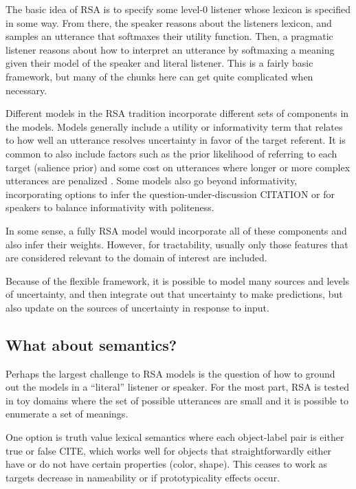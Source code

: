 \documentclass[]{article}
\begin{document}
The basic idea of RSA is to specify some level-0 listener whose lexicon is specified in some way. From there, the speaker reasons about the listeners lexicon, and samples an utterance that softmaxes their utility function. Then, a pragmatic listener reasons about how to interpret an utterance by softmaxing a meaning given their model of the speaker and literal listener. This is a fairly basic framework, but many of the chunks here can get quite complicated when necessary. 

Different models in the RSA tradition incorporate different sets of components in the models. Models generally include a utility or informativity term that relates to how well an utterance resolves uncertainty in favor of the target referent.  It is common to also include factors such as the prior likelihood of referring to each target (salience prior) and some cost on utterances where longer or more complex utterances are penalized \cite{goodman2016}. Some models also go beyond informativity, incorporating options to infer the question-under-discussion CITATION or for speakers to balance informativity with politeness.

In some sense, a fully RSA model would incorporate all of these components and also infer their weights. However, for tractability, usually only those features that are considered relevant to the domain of interest are included.
 
Because of the flexible framework, it is possible to model many sources and levels of uncertainty, and then integrate out that uncertainty to make predictions, but also update on the sources of uncertainty in response to input. 

\subsection{What about semantics?}

Perhaps the largest challenge to RSA models is the question of how to ground out the models in a ``literal'' listener or speaker. For the most part, RSA is tested in toy domains where the set of possible utterances are small and it is possible to enumerate a set of meanings.

One option is truth value lexical semantics where each object-label pair is either true or false CITE, which works well for objects that straightforwardly either have or do not have certain properties (color, shape). This ceases to work as targets decrease in nameability or if prototypicality effects occur. 
\end{document}
